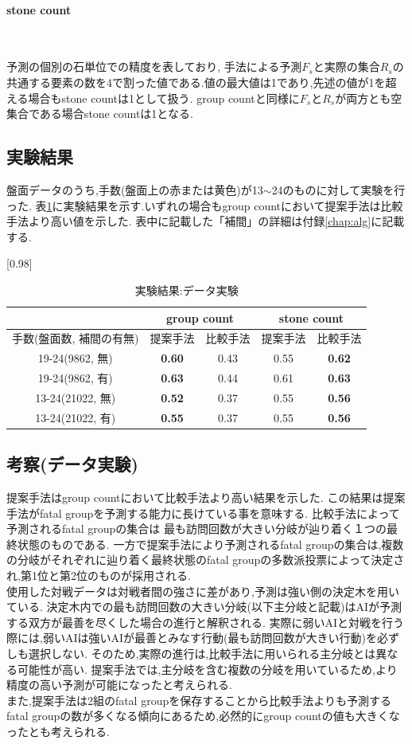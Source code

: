\paragraph{stone count}~
\par 予測の個別の石単位での精度を表しており,
手法による予測$F_s$と実際の集合$R_s$の共通する要素の数を4で割った値である.値の最大値は1であり,先述の値が1を超える場合もstone countは1として扱う.
group countと同様に$F_s$と$R_s$が両方とも空集合である場合stone countは1となる.
\subsection{実験結果}
盤面データのうち,手数(盤面上の赤または黄色)が13$\sim$24のものに対して実験を行った.
表\ref{table:result-online}に実験結果を示す.いずれの場合もgroup countにおいて提案手法は比較手法より高い値を示した.
表中に記載した「補間」の詳細は付録\ref{chap:alg}に記載する.
\begin{table}[H]
	\caption{実験結果:データ実験}
	\centering
	\scalebox{0.98}[0.98]{
		\begin{tabular}{c|c|c|c|c}
			\multicolumn{1}{c}{} & \multicolumn{2}{|c|}{group count} 
			& \multicolumn{2}{c|}{stone count}\\ \hline \hline
			手数(盤面数, 補間の有無)    & 提案手法 & 比較手法 & 提案手法 & 比較手法 \\ \hline
			19-24(9862, 無)    & \bf{0.60} & 0.43 & 0.55 & \bf{0.62} \\
			19-24(9862, 有)    & \bf{0.63} & 0.44 & 0.61 & \bf{0.63}  \\
			13-24(21022, 無)   & \bf{0.52} & 0.37 & 0.55 & \bf{0.56}  \\
			13-24(21022, 有)   & \bf{0.55} & 0.37 & 0.55 & \bf{0.56}  \\
		\end{tabular}
	}
	\label{table:result-online}
\end{table}
\subsection{考察(データ実験)}
提案手法はgroup countにおいて比較手法より高い結果を示した.
この結果は提案手法がfatal groupを予測する能力に長けている事を意味する.
比較手法によって予測されるfatal groupの集合は
最も訪問回数が大きい分岐が辿り着く１つの最終状態のものである.
一方で提案手法により予測されるfatal groupの集合は,複数の分岐がそれぞれに辿り着く最終状態のfatal groupの多数派投票によって決定され,第1位と第2位のものが採用される.\\
使用した対戦データは対戦者間の強さに差があり,予測は強い側の決定木を用いている.
決定木内での最も訪問回数の大きい分岐(以下主分岐と記載)はAIが予測する双方が最善を尽くした場合の進行と解釈される.
実際に弱いAIと対戦を行う際には,弱いAIは強いAIが最善とみなす行動(最も訪問回数が大きい行動)を必ずしも選択しない.
そのため,実際の進行は,比較手法に用いられる主分岐とは異なる可能性が高い.
提案手法では,主分岐を含む複数の分岐を用いているため,より精度の高い予測が可能になったと考えられる.\\
また,提案手法は2組のfatal groupを保存することから比較手法よりも予測するfatal groupの数が多くなる傾向にあるため,必然的にgroup countの値も大きくなったとも考えられる.


